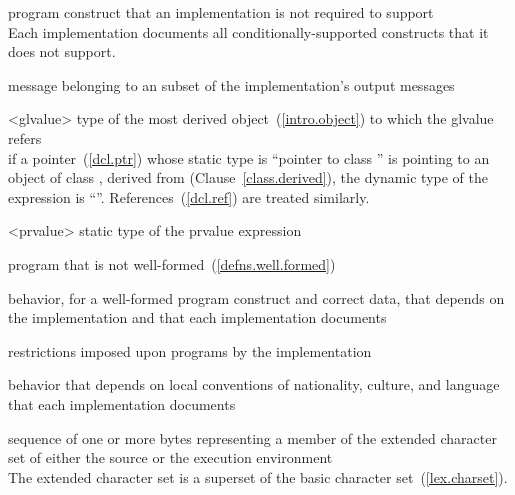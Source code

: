 %
program construct that an implementation is not required to support\\
\enternote Each implementation documents all conditionally-supported
constructs that it does not support.\exitnote

%
message belonging to an  subset of the
implementation's output messages

%
<glvalue> type of the most derived object~(\ref{intro.object}) to which the
glvalue refers\\
\enterexample
if a pointer~(\ref{dcl.ptr})  whose static type is ``pointer to
class '' is pointing to an object of class , derived
from  (Clause~\ref{class.derived}), the dynamic type of the
expression  is ``''. References~(\ref{dcl.ref}) are
treated similarly.
\exitexample

%
<prvalue> static type of the prvalue expression

%
program that is not well-formed~(\ref{defns.well.formed})

%
behavior, for a well-formed program construct and correct data, that
depends on the implementation and that each implementation documents

%
restrictions imposed upon programs by the implementation

%
behavior that depends on local conventions of nationality, culture, and
language that each implementation documents

%
sequence of one or more bytes representing a member of the extended
character set of either the source or the execution environment\\
\enternote The
extended character set is a superset of the basic character
set~(\ref{lex.charset}).\exitnote

